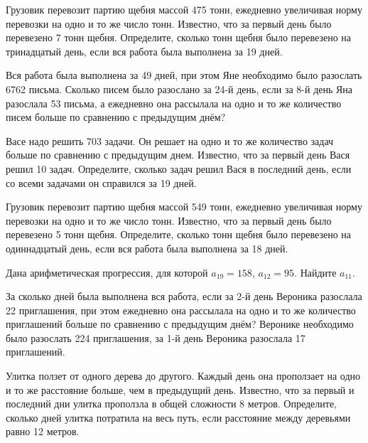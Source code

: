 \documentclass[4apaper]{article}
\begin{document}
\begin{taskBN}{1}
Грузовик перевозит партию щебня массой 475 тонн, ежедневно увеличивая норму перевозки на одно и то же число тонн. Известно, что за первый день было перевезено 7 тонн щебня. Определите, сколько тонн щебня было перевезено на тринадцатый день, если вся работа была выполнена за 19 дней.
\end{taskBN}

\begin{taskBN}{2}
Вся работа была выполнена за 49 дней, при этом Яне необходимо было разослать 6762 письма. Сколько писем было разослано за 24-й день, если за 8-й день Яна разослала 53 письма, а ежедневно она рассылала на одно и то же количество писем больше по сравнению с предыдущим днём? 
\end{taskBN}

\begin{taskBN}{3}
Васе надо решить 703 задачи. Он решает на одно и то же количество задач больше по сравнению с предыдущим днем. Известно, что за первый день Вася решил 10 задач. Определите, сколько задач решил Вася в последний день, если со всеми задачами он справился за 19 дней.
\end{taskBN}

\begin{taskBN}{4}
Грузовик перевозит партию щебня массой 549 тонн, ежедневно увеличивая норму перевозки на одно и то же число тонн. Известно, что за первый день было перевезено 5 тонн щебня. Определите, сколько тонн щебня было перевезено на одиннадцатый день, если вся работа была выполнена за 18 дней.
\end{taskBN}

\begin{taskBN}{5}
Дана арифметическая прогрессия, для которой $a_{19} = 158$, $a_{12} = 95$. Найдите $a_{11}$.
\end{taskBN}

\begin{taskBN}{6}
За сколько дней была выполнена вся работа, если за 2-й день Вероника разослала 22 приглашения, при этом ежедневно она рассылала на одно и то же количество приглашений больше по сравнению с предыдущим днём? Веронике необходимо было разослать 224 приглашения, за 1-й день Вероника разослала 17 приглашений. 
\end{taskBN}

\begin{taskBN}{7}
 Улитка ползет от одного дерева до другого. Каждый день она проползает на одно и то же расстояние больше, чем в предыдущий день. Известно, что за первый и последний дни улитка проползла в общей сложности 8 метров. Определите, сколько дней улитка потратила на весь путь, если расстояние между деревьями равно 12 метров.
\end{taskBN}
\end{document}
